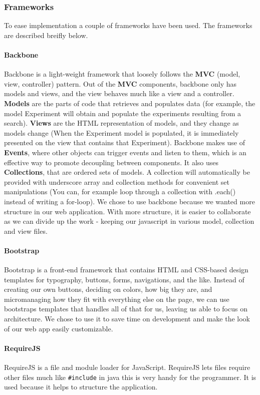 \subsubsection{Frameworks}
\label{sec:web_frame}
To ease implementation a couple of frameworks have been used. The frameworks are described breifly below.
\paragraph{Backbone}
Backbone\cite{web_1} is a light-weight framework that loosely follows the \textbf{MVC} (model, view, controller) pattern. Out of the \textbf{MVC} components, backbone only has models and views, and the view behaves much like a view and a controller. \textbf{Models} are the parts of code that retrieves and populates data (for example, the model Experiment will obtain and populate the experiments resulting from a search). \textbf{Views} are the HTML representation of models, and they change as models change (When the Experiment model is populated, it is immediately presented on the view that contains that Experiment).
Backbone makes use of \textbf{Events}, where other objects can trigger events and listen to them, which is an effective way to promote decoupling between components. It also uses \textbf{Collections}, that are ordered sets of models. A collection will automatically be provided with underscore array and collection methods for convenient set manipulations (You can, for example loop through a collection with .each() instead of writing a for-loop). We chose to use backbone because we wanted more structure in our web application. With more structure, it is easier to collaborate as we can divide up the work - keeping our javascript in various model, collection and view files.

\paragraph{Bootstrap}
Bootstrap\cite{web_2} is a front-end framework that contains HTML and CSS-based design templates for typography, buttons, forms, navigations, and the like. Instead of creating our own buttons, deciding on colors, how big they are, and micromanaging how they fit with everything else on the page, we can use bootstraps templates that handles all of that for us, leaving us able to focus on architecture. We chose to use it to save time on development and make the look of our web app easily customizable.

\paragraph{RequireJS}
RequireJS\cite{web_5} is a file and module loader for JavaScript. RequireJS lets files require other files much like \texttt{\#include} in java this is very handy for the programmer. It is used because it helps to structure the application.
